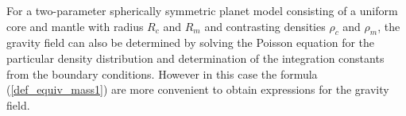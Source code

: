 \vspace{0.5cm}

For a two-parameter spherically symmetric planet model consisting of 
a uniform core and mantle with radius $R_c$ and $R_m$ 
and contrasting densities $\rho_c$ and $\rho_m$,
the gravity field can also be determined by solving the
Poisson equation for the particular density distribution and 
determination of the integration constants from the boundary conditions.
However in this case the formula (\ref{def_equiv_mass1}) are more
convenient to obtain expressions for the gravity field.

\vspace{0.5cm}
